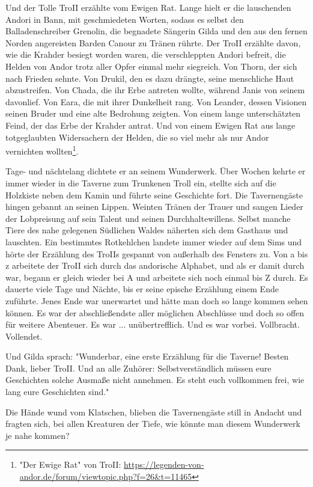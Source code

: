 Und der Tolle TroII erzählte vom Ewigen Rat. Lange hielt er die lauschenden Andori in Bann, mit geschmiedeten Worten, sodass es selbst den Balladenschreiber Grenolin, die begnadete Sängerin Gilda und den aus den fernen Norden angereisten Barden Canour zu Tränen rührte. Der TroII erzählte davon, wie die Krahder besiegt worden waren, die verschleppten Andori befreit, die Helden von Andor trotz aller Opfer einmal mehr siegreich. Von Thorn, der sich nach Frieden sehnte. Von Drukil, den es dazu drängte, seine menschliche Haut abzustreifen. Von Chada, die ihr Erbe antreten  wollte, während Janis von seinem davonlief. Von Eara, die mit ihrer Dunkelheit rang. Von Leander, dessen Visionen seinen Bruder und eine alte Bedrohung zeigten. Von einem lange unterschätzten Feind, der das Erbe der Krahder antrat. Und von einem Ewigen Rat aus lange totgeglaubten Widersachern der Helden, die so viel mehr als nur Andor vernichten wollten\footnote{"Der Ewige Rat" von TroII: \url{https://legenden-von-andor.de/forum/viewtopic.php?f=26&t=11465}}.

Tage- und nächtelang dichtete er an seinem Wunderwerk. Über Wochen kehrte er immer wieder in die Taverne zum Trunkenen Troll ein, stellte sich auf die Holzkiste neben dem Kamin und führte seine Geschichte fort. Die Tavernengäste hingen gebannt an seinen Lippen. Weinten Tränen der Trauer und sangen Lieder der Lobpreisung auf sein Talent und seinen Durchhaltewillens. Selbst manche Tiere des nahe gelegenen Südlichen Waldes näherten sich dem Gasthaus und lauschten. Ein bestimmtes Rotkehlchen landete immer wieder auf dem Sims und hörte der Erzählung des TroIIs gespannt von außerhalb des Fensters zu. Von a bis z arbeitete der TroII sich durch das andorische Alphabet, und als er damit durch war, begann er gleich wieder bei A und arbeitete sich noch einmal bis Z durch.  Es dauerte viele Tage und Nächte, bis er seine epische Erzählung einem Ende zuführte. Jenes Ende war unerwartet und hätte man doch so lange kommen sehen können. Es war der abschließendste aller möglichen Abschlüsse und doch so offen für weitere Abenteuer. Es war ... unübertrefflich. Und es war vorbei. Vollbracht. Vollendet.

Und Gilda sprach: "Wunderbar, eine erste Erzählung für die Taverne! Besten Dank, lieber TroII. Und an alle Zuhörer: Selbstverständlich müssen eure Geschichten solche Ausmaße nicht annehmen. Es steht euch vollkommen frei, wie lang eure Geschichten sind."

Die Hände wund vom Klatschen, blieben die Tavernengäste still in Andacht und fragten sich, bei allen Kreaturen der Tiefe, wie könnte man diesem Wunderwerk je nahe kommen? 



